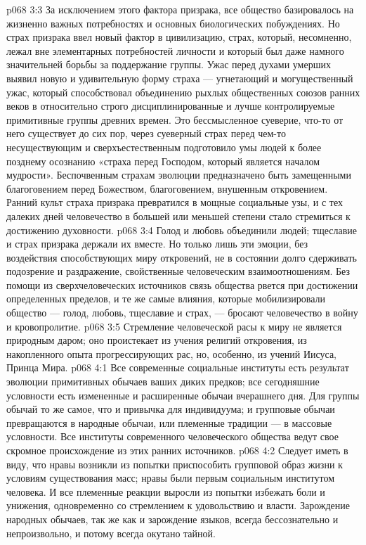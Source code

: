 \vs p068 3:3 За исключением этого фактора призрака, все общество базировалось на жизненно важных потребностях и основных биологических побуждениях. Но страх призрака ввел новый фактор в цивилизацию, страх, который, несомненно, лежал вне элементарных потребностей личности и который был даже намного значительней борьбы за поддержание группы. Ужас перед духами умерших выявил новую и удивительную форму страха --- угнетающий и могущественный ужас, который способствовал объединению рыхлых общественных союзов ранних веков в относительно строго дисциплинированные и лучше контролируемые примитивные группы древних времен. Это бессмысленное суеверие, что\hyp{}то от него существует до сих пор, через суеверный страх перед чем\hyp{}то несуществующим и сверхъестественным подготовило умы людей к более позднему осознанию «страха перед Господом, который является началом мудрости». Беспочвенным страхам эволюции предназначено быть замещенными благоговением перед Божеством, благоговением, внушенным откровением. Ранний культ страха призрака превратился в мощные социальные узы, и с тех далеких дней человечество в большей или меньшей степени стало стремиться к достижению духовности.
\vs p068 3:4 \pc Голод и любовь объединили людей; тщеславие и страх призрака держали их вместе. Но только лишь эти эмоции, без воздействия способствующих миру откровений, не в состоянии долго сдерживать подозрение и раздражение, свойственные человеческим взаимоотношениям. Без помощи из сверхчеловеческих источников связь общества рвется при достижении определенных пределов, и те же самые влияния, которые мобилизировали общество --- голод, любовь, тщеславие и страх, --- бросают человечество в войну и кровопролитие.
\vs p068 3:5 Стремление человеческой расы к миру не является природным даром; оно проистекает из учения религий откровения, из накопленного опыта прогрессирующих рас, но, особенно, из учений Иисуса, Принца Мира.
\vs p068 4:1 Все современные социальные институты есть результат эволюции примитивных обычаев ваших диких предков; все сегодняшние условности есть измененные и расширенные обычаи вчерашнего дня. Для группы обычай то же самое, что и привычка для индивидуума; и групповые обычаи превращаются в народные обычаи, или племенные традиции --- в массовые условности. Все институты современного человеческого общества ведут свое скромное происхождение из этих ранних источников.
\vs p068 4:2 Следует иметь в виду, что нравы возникли из попытки приспособить групповой образ жизни к условиям существования масс; нравы были первым социальным институтом человека. И все племенные реакции выросли из попытки избежать боли и унижения, одновременно со стремлением к удовольствию и власти. Зарождение народных обычаев, так же как и зарождение языков, всегда бессознательно и непроизвольно, и потому всегда окутано тайной.
